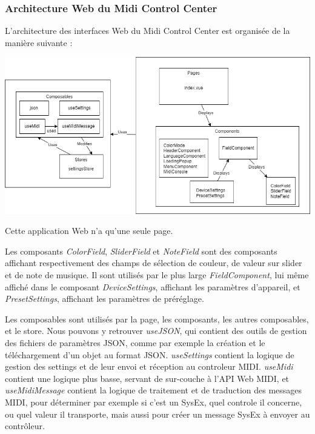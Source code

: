 \documentclass[francais]{rapportPFE}  %
\begin{document}
\subsubsection{Architecture Web du Midi Control Center}

L'architecture des interfaces Web du Midi Control Center est organisée de la manière suivante : 

\begin{center}
    \centering
    \includegraphics[width=15cm]{graphics/minilab3nuxt.png}
    \label{fig:test1}
\end{center}

Cette application Web n'a qu'une seule page.

Les composants \textit{ColorField}, \textit{SliderField} et \textit{NoteField} sont des composants affichant respectivement des champs de sélection de couleur, de valeur sur slider et de note de musique. Il sont utilisés par le plus large \textit{FieldComponent}, lui même affiché dans le composant \textit{DeviceSettings}, affichant les paramètres d'appareil, et \textit{PresetSettings}, affichant les paramètres de préréglage.

Les composables sont utilisés par la page, les composants, les autres composables, et le store. Nous pouvons y retrouver \textit{useJSON}, qui contient des outils de gestion des fichiers de paramètres JSON, comme par exemple la création et le téléchargement d'un objet au format JSON. \textit{useSettings} contient la logique de gestion des settings et de leur envoi et réception au controleur MIDI. \textit{useMidi} contient une logique plus basse, servant de sur-couche à l'API Web MIDI, et \textit{useMidiMessage} contient la logique de traitement et de traduction des messages MIDI, pour déterminer par exemple si c'est un SysEx, quel controle il concerne, ou quel valeur il transporte, mais aussi pour créer un message SysEx à envoyer au contrôleur.
\end{document}
